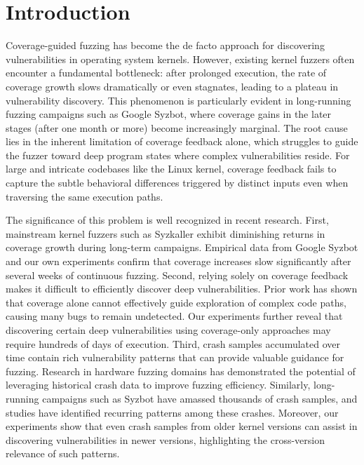 \section{Introduction}

Coverage-guided fuzzing has become the de facto approach for discovering vulnerabilities in operating system kernels. However, existing kernel fuzzers often encounter a fundamental bottleneck: after prolonged execution, the rate of coverage growth slows dramatically or even stagnates, leading to a plateau in vulnerability discovery. This phenomenon is particularly evident in long-running fuzzing campaigns such as Google Syzbot, where coverage gains in the later stages (after one month or more) become increasingly marginal. The root cause lies in the inherent limitation of coverage feedback alone, which struggles to guide the fuzzer toward deep program states where complex vulnerabilities reside. For large and intricate codebases like the Linux kernel, coverage feedback fails to capture the subtle behavioral differences triggered by distinct inputs even when traversing the same execution paths.

The significance of this problem is well recognized in recent research. First, mainstream kernel fuzzers such as Syzkaller exhibit diminishing returns in coverage growth during long-term campaigns. Empirical data from Google Syzbot and our own experiments confirm that coverage increases slow significantly after several weeks of continuous fuzzing. Second, relying solely on coverage feedback makes it difficult to efficiently discover deep vulnerabilities. Prior work has shown that coverage alone cannot effectively guide exploration of complex code paths, causing many bugs to remain undetected. Our experiments further reveal that discovering certain deep vulnerabilities using coverage-only approaches may require hundreds of days of execution. Third, crash samples accumulated over time contain rich vulnerability patterns that can provide valuable guidance for fuzzing. Research in hardware fuzzing domains has demonstrated the potential of leveraging historical crash data to improve fuzzing efficiency. Similarly, long-running campaigns such as Syzbot have amassed thousands of crash samples, and studies have identified recurring patterns among these crashes. Moreover, our experiments show that even crash samples from older kernel versions can assist in discovering vulnerabilities in newer versions, highlighting the cross-version relevance of such patterns.

